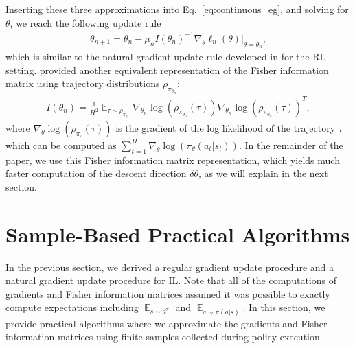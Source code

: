 \documentclass{article}
\newcommand{\BB}[1]{\textcolor{red}{\bf Byron: {#1}}}
\begin{document}
Inserting these three approximations into Eq.~\ref{eq:continuous_eg}, and solving for $\theta$, we reach the following update rule
\begin{align}
\theta_{n+1} = \theta_n - \mu_{n}I(\theta_n)^{-1}\nabla_{\theta}\ell_n(\theta)|_{\theta =\theta_n},
\end{align} which is similar to the natural gradient update rule developed in \cite{kakade2002natural} %
for the RL setting. 
\citet{bagnell2003covariant} provided another equivalent representation of the Fisher information matrix using trajectory distributions $\rho_{\pi_{\theta_n}}$:
\begin{align}
\label{eq:fisher_traj}
I(\theta_n) = \frac{1}{H^2}\mathop{\mathop{\mathbb{E}}}_{\tau\sim \rho_{\pi_{\theta_n}}}\nabla_{\theta_n}\log(\rho_{\pi_{\theta_n}}(\tau))\nabla_{\theta_n}\log(\rho_{\pi_{\theta_n}}(\tau))^T,
\end{align} where $\nabla_{\theta}\log(\rho_{\pi_{\tau}}(\tau))$ is the gradient of the log likelihood of the trajectory $\tau$ which can be computed as $\sum_{t=1}^H\nabla_{\theta}\log(\pi_{\theta}(a_t|s_t))$. In the remainder of the paper, we use this Fisher information matrix representation, which yields much faster computation of the descent direction $\delta\theta$, as we will explain in the next section.





\section{Sample-Based Practical Algorithms}
In the previous section, we derived a regular gradient update procedure and a natural gradient update procedure for IL. Note that all of the computations of gradients and Fisher information matrices assumed it was possible to exactly compute expectations including $\mathop{\mathbb{E}}_{s\sim d^{\pi}}$ and $\mathop{\mathbb{E}}_{a\sim \pi(a|s)}$. In this section, we provide practical algorithms where we approximate the gradients and Fisher information matrices using finite samples collected during policy execution. 
\end{document}
